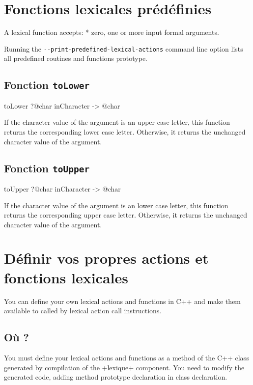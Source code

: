 \section{Fonctions lexicales prédéfinies}


A lexical function accepts:
  * zero, one or more input formal arguments.

Running the \texttt{-{}-print-predefined-lexical-actions} command line option lists all predefined routines and functions prototype.

\subsection{Fonction \texttt{toLower}}

\begin{galgas3}
toLower ?@char inCharacter -> @char
\end{galgas3}

If the character value of the argument is an upper case letter, this function returns the corresponding lower case letter. Otherwise, it returns the unchanged character value of the argument.

\subsection{Fonction \texttt{toUpper}}

\begin{galgas3}
toUpper ?@char inCharacter -> @char
\end{galgas3}


If the character value of the argument is an lower case letter, this function returns the corresponding upper case letter. Otherwise, it returns the unchanged character value of the argument.



\section{Définir vos propres actions et fonctions lexicales}

You can define your own lexical actions and functions in C++ and make them available to called by lexical action call instructions.

\subsection{Où ?}

You must define your lexical actions and functions as a method of the C++ class generated by compilation of the \ggst+lexique+ component. You need to modify the generated code, adding method prototype declaration in class declaration.

